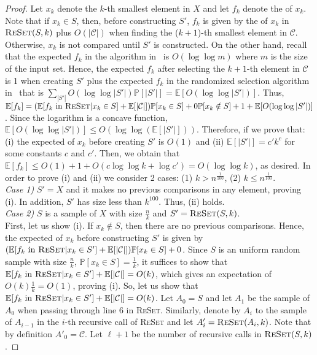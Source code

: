 \begin{proof}
Let $x_k$ denote the $k$-th smallest element in $X$ and let $f_k$ denote the \frag of $x_k$. 
Note that if $x_k \in S$, then, before constructing $S'$, $f_k$ is given by the \frag of $x_k$ in $\textsc{ReSet}(S,k)$ plus $O(|\mathcal{C}|)$ when finding the ($k+1$)-th smallest element in $\mathcal{C}$. Otherwise, $x_k$ is not compared until $S'$ is constructed. 
On the other hand, recall that the expected $f_k$ in the algorithm in~\cite{afshani:fragile-ESA19} is $O(\log \log m)$ where $m$ is the size of the input set. Hence, the expected $f_k$ after selecting the $k+1$-th element in  $\mathcal{C}$ is 1 when creating $S'$ plus the expected $f_k$ in the randomized selection algorithm in~\cite{afshani:fragile-ESA19} that is $\sum_{|S'|}O(\log \log |S'|)\mathbb{P}[|S'|]=\mathbb{E}[O(\log \log |S'|)]$. Thus, $\mathbb{E}[f_k]=(\mathbb{E}[f_k\text{ in \textsc{ReSet}}| x_k \in S]+\mathbb{E}[|\mathcal{C}|])\mathbb{P}[x_k \in S] + 0\mathbb{P}[x_k \notin S] + 1 + \mathbb{E}[O(\log \log |S'|)]$. Since the logarithm is a concave function,  $\mathbb{E}[O(\log \log |S'|)]\leq O(\log \log (\mathbb{E}[|S'|]))$.  
Therefore, if we prove that: (i) the expected \frag of $x_k$ before creating $S'$ is $O(1)$ and (ii) $\mathbb{E}[|S'|]=c'k^{c}$ for some constants $c$ and $c'$. Then, we obtain that $\mathbb{E}[f_k]\leq O(1)+1+O(c\log\log k+\log c') = O(\log \log k)$, as desired. In order to prove (i) and (ii) we consider 2 cases: (1) $k > n^{\frac{1}{100}}$, (2) $k \leq n^{\frac{1}{100}}$.
\\
\emph{Case 1)} $S' = X$ and it makes no previous comparisons in any element, proving (i). In addition, $S'$ has size less than $k^{100}$. Thus, (ii) holds. 
\\
\emph{Case 2)} $S$ is a sample of $X$ with size $\frac{n}{k}$ and $S'=\textsc{ReSet}(S, k)$. \\
First, let us show (i). If $x_k \notin S$, then there are no previous comparisons. Hence, the expected \frag of $x_k$ before constructing $S'$ is given by $(\mathbb{E}[f_k\text{ in \textsc{ReSet}}| x_k \in S'] + \mathbb{E}[|\mathcal{C}|])\mathbb{P}[x_k \in S]+ 0$. Since $S$ is an uniform random sample with size $\frac{n}{k}$, $\mathbb{P}[x_k \in S] = \frac{1}{k}$, it suffices to show that $\mathbb{E}[f_k\text{ in \textsc{ReSet}}| x_k \in S'] + \mathbb{E}[|\mathcal{C}|]=O(k)$, which gives an expectation of $O(k)\frac{1}{k}=O(1)$, proving (i). So, let us show that $\mathbb{E}[f_k\text{ in \textsc{ReSet}}| x_k \in S'] + \mathbb{E}[|\mathcal{C}|]=O(k)$. 
Let $A_0=S$ and let $A_1$ be the sample of $A_0$ when passing through line 6 in \textsc{ReSet}. Similarly, denote by $A_i$ to the sample of $A_{i-1}$ in the $i$-th recursive call of \textsc{ReSet} and let $A'_i=\textsc{ReSet}(A_{i}, k)$. Note that by definition $A'_0=\mathcal{C}$. 
Let $\ell+1$ be the number of recursive calls in $\textsc{ReSet}(S, k)$.  


\end{proof}
